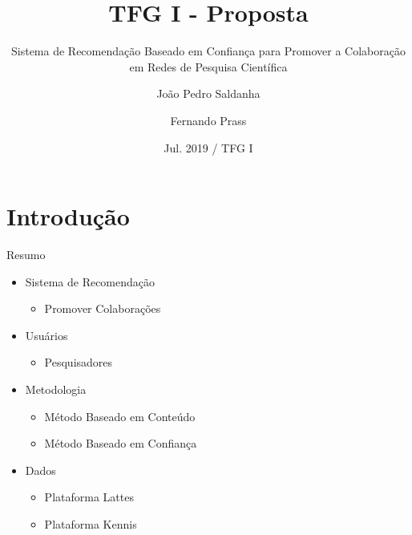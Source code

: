 \documentclass{beamer}
\title
  [Sistema de Recomendação Baseado em Confiança para Promover a Colaboração em Redes de Pesquisa Científica]
  {TFG I - Proposta}
\subtitle{Sistema de Recomendação Baseado em Confiança para Promover a Colaboração em Redes de Pesquisa Científica}
\author[João Pedro Raskopf, Fernando Prass]{João Pedro Saldanha\inst{1} \and Fernando Prass\inst{1}}
\institute[Some University]
{
  \inst{1}%
  Ciência da Computação\\
  Universidade Fransicana
}
\date[Proposta TFG]{Jul. 2019 / TFG I}
\begin{document}
\begin{frame}
  \titlepage
\end{frame}

\section{Introdução}

\begin{frame}{Resumo}{}
  
  \begin{itemize}
    \item Sistema de Recomendação
    \begin{itemize}
      \item Promover Colaborações
    \end{itemize}
  \end{itemize}

  \begin{itemize}
    \item Usuários
    \begin{itemize}
      \item Pesquisadores
    \end{itemize}
  \end{itemize}
  
  \begin{itemize}
    \item Metodologia
    \begin{itemize}
      \item Método Baseado em Conteúdo
      \item Método Baseado em Confiança
    \end{itemize}
  \end{itemize}

  \begin{itemize}
    \item Dados
    \begin{itemize}
      \item Plataforma Lattes
      \item Plataforma Kennis
    \end{itemize}
  \end{itemize}

\end{frame}
\end{document}
